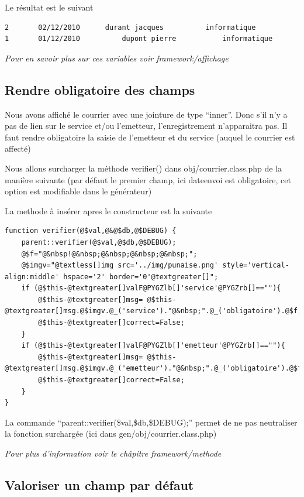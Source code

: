 \documentclass[letterpaper,10pt,french]{manual}
\begin{document}
Le résultat est le suivant

\begin{Verbatim}[commandchars=@\[\]]
2       02/12/2010      durant jacques          informatique
1       01/12/2010          dupont pierre           informatique
\end{Verbatim}

\emph{Pour en savoir plus sur ces variables voir framework/affichage}


\subsection{Rendre obligatoire des champs}

Nous avons affiché le courrier avec une jointure de type ``inner''.
Donc s'il n'y a pas de lien sur le service et/ou l'emetteur, l'enregistrement
n'apparaitra pas. Il faut rendre obligatoire la saisie de  l'emetteur et du service (auquel le courrier est affecté)

Nous allons surcharger la méthode verifier() dans obj/courrier.class.php de la manière suivante
(par défaut le premier champ, ici dateenvoi est obligatoire, cet option est modifiable
dans le générateur)

La methode à insérer apres le constructeur est la suivante

\begin{Verbatim}[commandchars=@\[\]]
function verifier(@$val,@&@$db,@$DEBUG) {
    parent::verifier(@$val,@$db,@$DEBUG);
    @$f="@&nbsp!@&nbsp;@&nbsp;@&nbsp;@&nbsp;";
    @$imgv="@textless[]img src='../img/punaise.png' style='vertical-align:middle' hspace='2' border='0'@textgreater[]";
    if (@$this-@textgreater[]valF@PYGZlb[]'service'@PYGZrb[]==""){
        @$this-@textgreater[]msg= @$this-@textgreater[]msg.@$imgv.@_('service')."@&nbsp;".@_('obligatoire').@$f;
        @$this-@textgreater[]correct=False;
    }
    if (@$this-@textgreater[]valF@PYGZlb[]'emetteur'@PYGZrb[]==""){
        @$this-@textgreater[]msg= @$this-@textgreater[]msg.@$imgv.@_('emetteur')."@&nbsp;".@_('obligatoire').@$f;
        @$this-@textgreater[]correct=False;
    }
}
\end{Verbatim}

La commande ``parent::verifier(\$val,\$db,\$DEBUG);'' permet de ne pas neutraliser la
fonction surchargée (ici dans gen/obj/courrier.class.php)

\emph{Pour plus d'information voir le châpitre framework/methode}


\subsection{Valoriser un champ par défaut}
\end{document}
